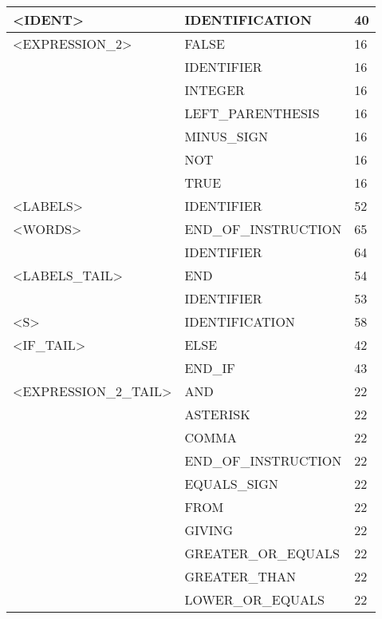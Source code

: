 \begin{longtable}{|l|l|l|}
<IDENT>              &   IDENTIFICATION       &   40 \\ \hline
<EXPRESSION\_2>       &   FALSE                &   16 \\ \hline
                     &   IDENTIFIER           &   16 \\ \hline
                     &   INTEGER              &   16 \\ \hline
                     &   LEFT\_PARENTHESIS     &   16 \\ \hline
                     &   MINUS\_SIGN           &   16 \\ \hline
                     &   NOT                  &   16 \\ \hline
                     &   TRUE                 &   16 \\ \hline
<LABELS>             &   IDENTIFIER           &   52 \\ \hline
<WORDS>              &   END\_OF\_INSTRUCTION   &   65 \\ \hline
                     &   IDENTIFIER           &   64 \\ \hline
<LABELS\_TAIL>        &   END                  &   54 \\ \hline
                     &   IDENTIFIER           &   53 \\ \hline
<S>                  &   IDENTIFICATION       &   58 \\ \hline
<IF\_TAIL>            &   ELSE                 &   42 \\ \hline
                     &   END\_IF               &   43 \\ \hline
<EXPRESSION\_2\_TAIL>  &   AND                  &   22 \\ \hline
                     &   ASTERISK             &   22 \\ \hline
                     &   COMMA                &   22 \\ \hline
                     &   END\_OF\_INSTRUCTION   &   22 \\ \hline
                     &   EQUALS\_SIGN          &   22 \\ \hline
                     &   FROM                 &   22 \\ \hline
                     &   GIVING               &   22 \\ \hline
                     &   GREATER\_OR\_EQUALS    &   22 \\ \hline
                     &   GREATER\_THAN         &   22 \\ \hline
                     &   LOWER\_OR\_EQUALS      &   22 \\ \hline

\end{longtable}

